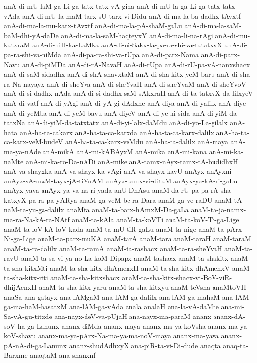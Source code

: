 {anA-di-mU-laM-ga-Li-ga-tatx-tatx-vA-giha
anA-di-mU-la-ga-Li-ga-tatx-tatx-vAda
anA-di-mU-la-maM-tarx-sU-tarx-vi-Didu
anA-di-ma-la-ba-dadhx-tAvxtf
anA-di-ma-la-mu-katx-tAvxtf
anA-di-ma-la-pA-shaM-gaLu
anA-di-ma-la-saM-baM-dhi-yA-daDe
anA-di-ma-la-saM-haqteyxY
anA-di-ma-li-na-rAgi
anA-di-mu-katxraM
anA-di-niH-ka-LaMka
anA-di-ni-Sakx-la-pa-ra-shi-va-tatatxvX
anA-di-pa-ra-shi-va-niMda
anA-di-pa-ra-shi-va-rUpa
anA-di-parx-Nama
anA-di-parx-Navu
anA-di-piMDa
anA-di-rA-NavaH
anA-di-rUpa
anA-di-rU-pa-vA-nanxshacx
anA-di-saM-sidadhx
anA-di-shA-shavxtaM
anA-di-sha-kitx-yeM-baru
anA-di-sha-ra-Na-nayayx
anA-di-sheYva
anA-di-sheYvaH
anA-di-sheYvaM
anA-di-sheYvoV
anA-di-si-dadhx-nAda
anA-di-si-dadhx-saM-sAkxraH
anA-di-ta-tatxvX-da-lilxyeV
anA-di-vatf
anA-di-yAgi
anA-di-yA-gi-dAdxne
anA-diya
anA-di-yalilx
anA-diye
anA-di-yeMba
anA-di-yeM-bavu
anA-diyeV
anA-di-ye-ni-sida
anA-di-yiM-da-tatxNa
anA-di-yiM-da-tatxtatx
anA-di-yi-lalx-daMdu
anA-di-yo-La-gilalx
anA-hata
anA-ha-ta-cakarx
anA-ha-ta-ca-karxda
anA-ha-ta-ca-karx-dalilx
anA-ha-ta-ca-karx-veM-budeV
anA-ha-ta-ca-karx-veMdu
anA-ha-ta-dalilx
anA-maya
anA-ma-ya-nAde
anA-mikA
anA-mi-kABAyxM
anA-mika
anA-mi-kana
anA-mi-ka-naMte
anA-mi-ka-ro-Da-nADi
anA-mike
anA-tamx-nAyx-tamx-tA-budidhxH
anA-va-shayxka
anA-va-shayx-ka-vAgi
anA-va-shayx-kavU
anAyx
anAyxni
anAyx-sA-maM-tayx-jA-tiVnAM
anAyx-tamx-vi-ditaM
anAyx-ya-kA-ri-gaLu
anAyx-yava
anAyx-ya-va-na-ri-yada
anU-DhAsu
anaM-da-rU-pa-pa-rA-sha-katxyX-pa-ra-pa-yARya
anaM-ga-veM-be-ra-Dara
anaM-ga-ve-raDU
anaM-tA-naM-ta-yu-ga-dalilx
anaMta
anaM-ta-barx-hAmxM-Da-gaLa
anaM-ta-ja-namx-ma-ra-Na-kA-ra-NAtf
anaM-ta-kAla
anaM-ta-koVTi
anaM-ta-koV-Ti-ga-Lige
anaM-ta-loV-kA-loV-kada
anaM-ta-mU-tiR-gaLu
anaM-ta-nige
anaM-ta-pArx-Ni-ga-Lige
anaM-ta-parx-muKA
anaM-tarA
anaM-tara
anaM-taraH
anaM-taraM
anaM-ta-ra-dalilx
anaM-ta-ramA
anaM-ta-rashacx
anaM-ta-ra-sheYvaH
anaM-ta-ravU
anaM-ta-sa-vi-ya-no-La-koM-Dipapx
anaM-tashacx
anaM-ta-shakitx
anaM-ta-sha-kitxMti
anaM-ta-sha-kitx-dhAmenxH
anaM-ta-sha-kitx-dhAmenxV
anaM-ta-sha-kitx-riti
anaM-ta-sha-kitxshacx
anaM-ta-sha-kitx-shacx-vi-BoV-viR-dhijAcnxH
anaM-ta-sha-kitx-yaru
anaM-ta-sha-kitxyu
anaM-teVsha
anaMtoVH
anaSa
ana-gatayx
ana-lAMgaM
ana-lAM-ga-dalilx
ana-lAM-ga-mahaM
ana-lAM-ga-ma-haM-hasatxM
ana-lAM-ga-vAda
anala
analaH
ana-la-vA-daMte
ana-mi-Sa-vA-gu-titxde
ana-nayx-deV-va-pUjaH
ana-nayx-ma-paraM
ananx
ananx-dA-soV-ha-ga-Lanunx
ananx-diMda
ananx-maya
ananx-ma-ya-koVsha
ananx-ma-ya-koV-shavu
ananx-ma-ya-pArx-Na-ma-ya-ma-noV-maya
ananx-ma-yava
ananx-pA-nA-di-ga-Lanunx
ananx-shudAdhxyX
ana-piR-ta-vi-Di-dude
anaqta
anaq-ta-Barxme
anaqtaM
ana-shanxnf
}
